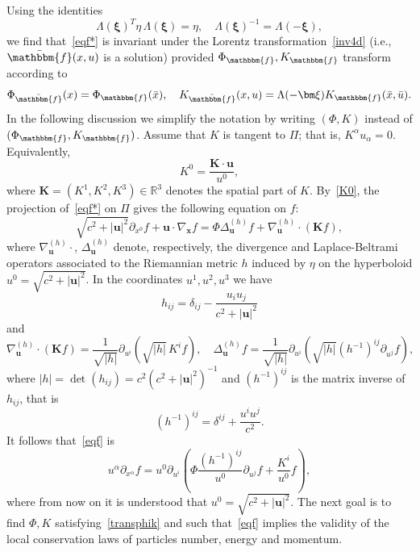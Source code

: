 \documentclass[12pt]{article}
\newcommand{\R}{\mathbb{R}}
\theoremstyle{definition}
\numberwithin{equation}{section}
\begin{document}
Using the identities
\begin{equation}\label{lambdaid}
\Lambda({\bm\xi})^T\eta\, \Lambda({\bm \xi})=\eta,
\quad \Lambda({\bm \xi})^{-1}=\Lambda(-{\bm \xi}),
\end{equation}
we find that~\eqref{eqf*} is invariant under the Lorentz transformation~\eqref{inv4d} (i.e., $\bar{\mathbbm{f}}(x,u)$ is a solution)
provided $\Phi_\mathbbm{f} ,K_\mathbbm{f} $ transform according to
\begin{equation}\label{transphik}
\Phi_{\bar{\mathbbm{f}}}(x)=\Phi_\mathbbm{f} (\bar{x}),\quad {K}_{\bar{\mathbbm{f}}}(x,u) =\Lambda(-{\bm \xi}) K_\mathbbm{f} (\bar{x},\bar{u}).
\end{equation}
In the following discussion we simplify the notation by writing $(\Phi,K)$ instead of $(\Phi_\mathbbm{f},K_\mathbbm{f})$. 
Assume that $K $ is tangent to $\Pi$; that is, $K ^\alpha u_\alpha=0$. Equivalently,
\begin{equation}\label{K0}
K^0=\frac{{\bm K} \cdot{\bm u}}{u^0},
\end{equation}
where ${\bm K} =(K ^1,K ^2,K ^3)\in\R^3$ denotes the spatial part of $K $. By~\eqref{K0}, the projection of~\eqref{eqf*} on $\Pi$ gives the following equation on $f$:
\begin{equation}\label{eqf}
\sqrt{c^2+|{\bm u}|^2}\partial_{x^0}f+{\bm u}\cdot\nabla_{{\bm x}}f=\Phi \Delta_{{\bm u}}^{(h)}f+\nabla_{{\bm u}}^{(h)}\cdot({\bm K}f),
\end{equation} 
where  $\nabla_{{\bm u}}^{(h)}\cdot $, $\Delta_{{\bm u}}^{(h)}$ denote, respectively, the divergence and Laplace-Beltrami operators associated to the Riemannian metric $h$  induced by $\eta$ on the hyperboloid $u^0=\sqrt{c^2+|{\bm u}|^2}$. In the coordinates $u^1,u^2,u^3$ we have
\[
h_{ij}=\delta_{ij}-\frac{u_iu_j}{c^2+|{\bm u}|^2}
\]
and 
\[
\nabla_{{\bm u}}^{(h)}\cdot({\bm K}f)=\frac{1}{\sqrt{|h|}}\partial_{u^i}\left(\sqrt{|h|}\,K^i f\right),\quad
\Delta_{{\bm u}}^{(h)}f=\frac{1}{\sqrt{|h|}}\partial_{u^i}\left(\sqrt{|h|}(h^{-1})^{ij}\partial_{u^j}f\right),
\]
where $|h|=\det(h_{ij})=c^2(c^2+|{\bm u}|^2)^{-1}$ and $(h^{-1})^{ij}$ is the matrix inverse of $h_{ij}$, that is 
\begin{equation}\label{inverseh}
(h^{-1})^{ij}=\delta^{ij}+\frac{u^iu^j}{c^2}.
\end{equation}
It follows that~\eqref{eqf} is
\begin{equation}\label{eqf2}
u^\alpha\partial_{x^\alpha}f=u^0\partial_{u^i}\left(\Phi\frac{(h^{-1})^{ij}}{u^0}\partial_{u^j}f+\frac{K^i}{u^0}f\right),
\end{equation}
where from now on it is understood that $u^0=\sqrt{c^2+|{\bm u}|^2}$.
The next goal is to find $\Phi,K$ satisfying~\eqref{transphik} and such that~\eqref{eqf} implies the validity of the local conservation laws of particles number, energy and momentum. 
\end{document}
